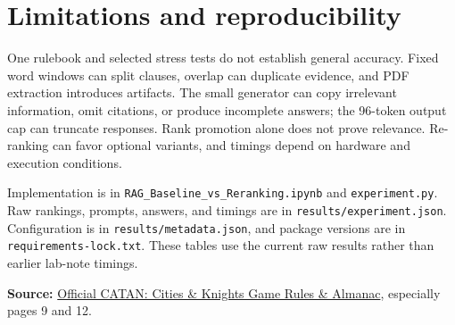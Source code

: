 \documentclass[10pt,a4paper]{article}
\begin{document}
\section{Limitations and reproducibility}
One rulebook and selected stress tests do not establish general accuracy. Fixed word windows can split clauses, overlap can duplicate evidence, and PDF extraction introduces artifacts. The small generator can copy irrelevant information, omit citations, or produce incomplete answers; the 96-token output cap can truncate responses. Rank promotion alone does not prove relevance. Re-ranking can favor optional variants, and timings depend on hardware and execution conditions.

Implementation is in \texttt{RAG\_Baseline\_vs\_Reranking.ipynb} and \texttt{experiment.py}. Raw rankings, prompts, answers, and timings are in \texttt{results/experiment.json}. Configuration is in \texttt{results/metadata.json}, and package versions are in \texttt{requirements-lock.txt}. These tables use the current raw results rather than earlier lab-note timings.

\textbf{Source:}
\href{https://www.catan.com/sites/default/files/2021-06/catan_c_k_2020_rule_book_200708.pdf}{Official CATAN: Cities \& Knights Game Rules \& Almanac}, especially pages 9 and 12.

\end{document}
